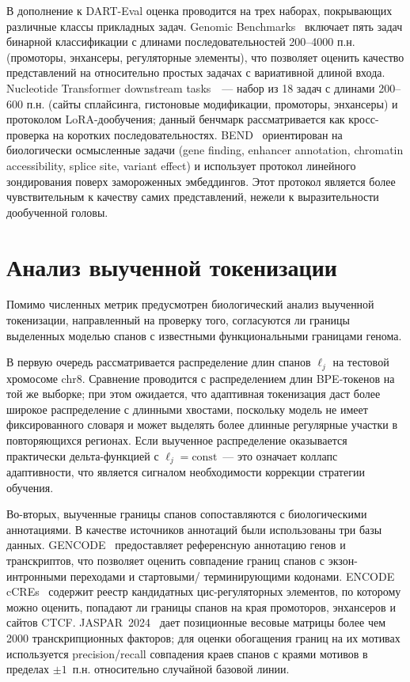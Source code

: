 В дополнение к DART-Eval оценка проводится на трех наборах,
покрывающих различные классы прикладных задач. Genomic
Benchmarks~\cite{gresovaGenomicBenchmarksCollection2023} включает пять
задач бинарной классификации с длинами последовательностей 200--4000
п.н. (промоторы, энхансеры, регуляторные элементы), что позволяет
оценить качество представлений на относительно простых задачах с
вариативной длиной входа. Nucleotide Transformer downstream
tasks~\cite{dalla-torreNucleotideTransformerBuilding2025}~--- набор из
18 задач с длинами 200--600 п.н. (сайты сплайсинга, гистоновые
модификации, промоторы, энхансеры) и протоколом
LoRA-дообучения; данный бенчмарк рассматривается как кросс-проверка на
коротких последовательностях. BEND~\cite{tangBENDBenchmarkDNA2024}
ориентирован на биологически осмысленные задачи (gene finding,
enhancer annotation, chromatin accessibility, splice site, variant
effect) и использует протокол линейного зондирования поверх
замороженных эмбеддингов. Этот протокол является более чувствительным
к качеству самих представлений, нежели к выразительности дообученной
головы.

\section{Анализ выученной токенизации}

Помимо численных метрик предусмотрен биологический анализ выученной
токенизации, направленный на проверку того, согласуются ли границы
выделенных моделью спанов с известными функциональными границами
генома.

В первую очередь рассматривается распределение длин спанов $\ell_j$ на
тестовой хромосоме chr8. Сравнение проводится с распределением длин
BPE-токенов на той же выборке; при этом ожидается, что адаптивная
токенизация даст более широкое распределение с длинными хвостами,
поскольку модель не имеет фиксированного словаря и может выделять
более длинные регулярные участки в повторяющихся регионах. Если
выученное распределение оказывается практически дельта-функцией с
$\ell_j = \text{const}$~--- это означает коллапс адаптивности, что
является сигналом необходимости коррекции стратегии обучения.

Во-вторых, выученные границы спанов сопоставляются с биологическими
аннотациями. В качестве источников аннотаций были использованы три
базы данных. GENCODE~\cite{frankishGENCODE2019} предоставляет
референсную аннотацию генов и транскриптов, что позволяет оценить
совпадение границ спанов с экзон-интронными переходами и стартовыми/
терминирующими кодонами. ENCODE
cCREs~\cite{encodeExpandedRegistry2024} содержит реестр кандидатных
цис-регуляторных элементов, по которому можно оценить, попадают ли
границы спанов на края промоторов, энхансеров и сайтов CTCF.
JASPAR~2024~\cite{rauluseviciuteJASPAR2024} дает позиционные весовые
матрицы более чем 2000 транскрипционных факторов; для оценки
обогащения границ на их мотивах используется precision/recall
совпадения краев спанов с краями мотивов в пределах $\pm 1$~п.н.
относительно случайной базовой линии.

